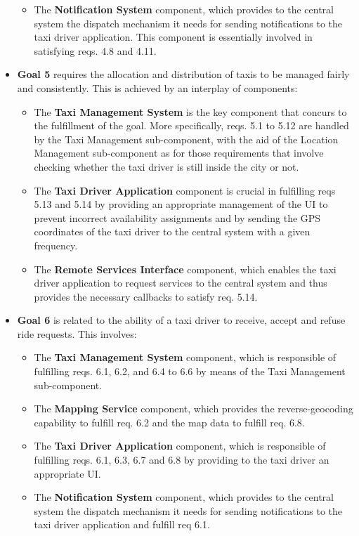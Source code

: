 \begin{itemize}
\begin{itemize}
	\item The \textbf{Notification System} component, which provides to the central system the dispatch mechanism it needs for sending notifications to the taxi driver application. This component is essentially involved in satisfying reqs. 4.8 and 4.11.
	\end{itemize}
	\item \textbf{Goal 5} requires the allocation and distribution of taxis to be managed fairly and consistently. This is achieved by an interplay of components: 
	\begin{itemize}
	\item The \textbf{Taxi Management System} is the key component that concurs to the fulfillment of the goal. More specifically, reqs. 5.1 to 5.12 are handled by the Taxi Management sub-component, with the aid of the Location Management sub-component as for those requirements that involve checking whether the taxi driver is still inside the city or not. 
	\item The \textbf{Taxi Driver Application} component is crucial in fulfilling reqs 5.13 and 5.14 by providing an appropriate management of the UI to prevent incorrect availability assignments and by sending the GPS coordinates of the taxi driver to the central system with a given frequency.
	\item The \textbf{Remote Services Interface} component, which enables the taxi driver application to request services to the central system and thus provides the necessary callbacks to satisfy req. 5.14. 	
	\end{itemize}
	\item \textbf{Goal 6} is related to the ability of a taxi driver to receive, accept and refuse ride requests. This involves:
	\begin{itemize}
	\item The \textbf{Taxi Management System} component, which is responsible of fulfilling reqs. 6.1, 6.2, and 6.4 to 6.6 by means of the Taxi Management sub-component.
	\item The \textbf{Mapping Service} component, which provides the reverse-geocoding capability to fulfill req. 6.2 and the map data to fulfill req. 6.8.
	\item The \textbf{Taxi Driver Application} component, which is responsible of fulfilling reqs. 6.1, 6.3, 6.7 and 6.8 by providing to the taxi driver an appropriate UI.
	\item The \textbf{Notification System} component, which provides to the central system the dispatch mechanism it needs for sending notifications to the taxi driver application and fulfill req 6.1.

\end{itemize}
\end{itemize}
